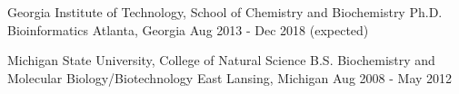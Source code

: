 \vspace{-2.0mm}


\begin{cventries}

  \cventry
  	{Georgia Institute of Technology, School of Chemistry and Biochemistry} %
    {Ph.D. Bioinformatics} %
    {Atlanta, Georgia} %
    {Aug 2013 - Dec 2018 \tiny {(expected)}} %
    {}

\vspace{-1em}

  \cventry
  	{Michigan State University, College of Natural Science} %
    {B.S. Biochemistry and Molecular Biology/Biotechnology} %
    {East Lansing, Michigan} %
    {Aug 2008 - May 2012} %
    {}
	
\vspace{-2em}


\end{cventries}
